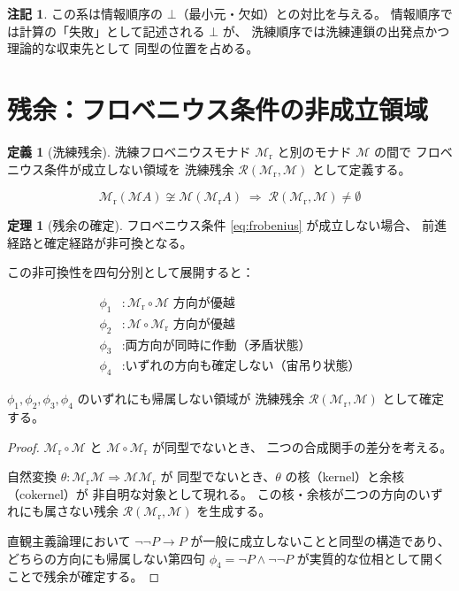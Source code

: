 \documentclass[11pt,a4paper]{article}
\theoremstyle{definition}
\newtheorem{definition}{定義}[section]
\newtheorem{theorem}{定理}[section]
\newtheorem{remark}{注記}[section]
\newcommand{\Mr}{\mathcal{M}_{\mathrm{r}}}
\begin{document}
\begin{remark}
この系は情報順序の $\bot$（最小元・欠如）との対比を与える。
情報順序では計算の「失敗」として記述される $\bot$ が、
洗練順序では洗練連鎖の出発点かつ理論的な収束先として
同型の位置を占める。
\end{remark}

\section{残余：フロベニウス条件の非成立領域}
\label{sec:residue}

\begin{definition}[洗練残余]
洗練フロベニウスモナド $\Mr$ と別のモナド $\mathcal{M}$ の間で
フロベニウス条件が成立しない領域を
洗練残余 $\mathcal{R}(\Mr, \mathcal{M})$ として定義する。

\begin{equation}
\Mr(\mathcal{M} A) \not\cong \mathcal{M}(\Mr A)
\;\Rightarrow\;
\mathcal{R}(\Mr, \mathcal{M}) \neq \emptyset
\end{equation}
\end{definition}

\begin{theorem}[残余の確定]
フロベニウス条件 \eqref{eq:frobenius} が成立しない場合、
前進経路と確定経路が非可換となる。

この非可換性を四句分別として展開すると：

\begin{align}
\phi_1 &: \Mr \circ \mathcal{M} \text{ 方向が優越} \\
\phi_2 &: \mathcal{M} \circ \Mr \text{ 方向が優越} \\
\phi_3 &: \text{両方向が同時に作動（矛盾状態）} \\
\phi_4 &: \text{いずれの方向も確定しない（宙吊り状態）}
\end{align}

$\phi_1, \phi_2, \phi_3, \phi_4$ のいずれにも帰属しない領域が
洗練残余 $\mathcal{R}(\Mr, \mathcal{M})$ として確定する。
\end{theorem}

\begin{proof}
$\Mr \circ \mathcal{M}$ と $\mathcal{M} \circ \Mr$ が同型でないとき、
二つの合成関手の差分を考える。

自然変換 $\theta: \Mr\mathcal{M} \Rightarrow \mathcal{M}\Mr$ が
同型でないとき、$\theta$ の核（kernel）と余核（cokernel）が
非自明な対象として現れる。
この核・余核が二つの方向のいずれにも属さない残余
$\mathcal{R}(\Mr, \mathcal{M})$ を生成する。

直観主義論理において
$\neg\neg P \to P$ が一般に成立しないことと同型の構造であり、
どちらの方向にも帰属しない第四句
$\phi_4 = \neg P \wedge \neg\neg P$
が実質的な位相として開くことで残余が確定する。
\end{proof}
\end{document}
